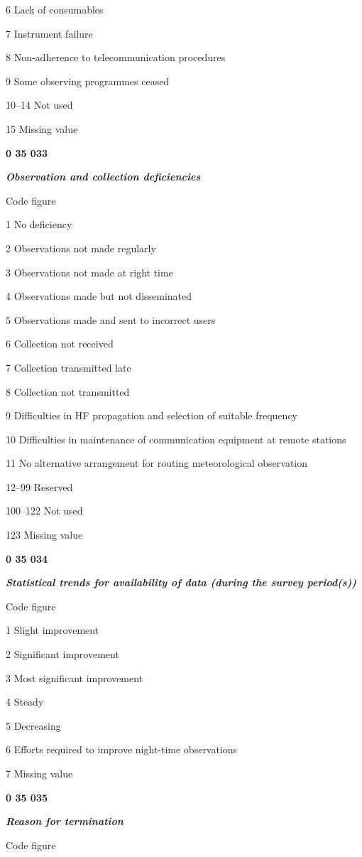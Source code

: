 6 Lack of consumables

7 Instrument failure

8 Non-adherence to telecommunication procedures

9 Some observing programmes ceased

10--14 Not used

15 Missing value

\textbf{0 35 033}

\emph{\textbf{Observation and collection deficiencies}}

Code figure

1 No deficiency

2 Observations not made regularly

3 Observations not made at right time

4 Observations made but not disseminated

5 Observations made and sent to incorrect users

6 Collection not received

7 Collection transmitted late

8 Collection not transmitted

9 Difficulties in HF propagation and selection of suitable frequency

10 Difficulties in maintenance of communication equipment at remote stations

11 No alternative arrangement for routing meteorological observation

12--99 Reserved

100--122 Not used

123 Missing value

\textbf{0 35 034}

\emph{\textbf{Statistical trends for availability of data (during the survey period(s))}}

Code figure

1 Slight improvement

2 Significant improvement

3 Most significant improvement

4 Steady

5 Decreasing

6 Efforts required to improve night-time observations

7 Missing value

\textbf{0 35 035}

\emph{\textbf{Reason for termination}}

Code figure

